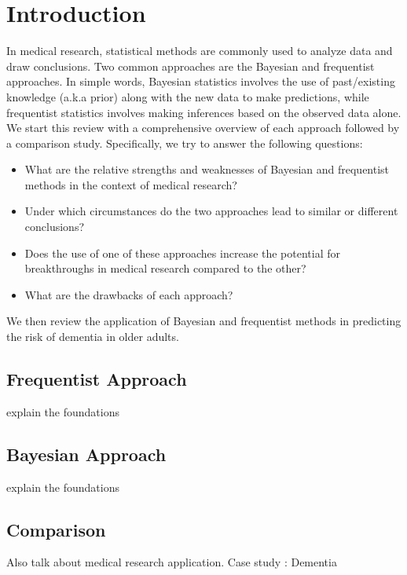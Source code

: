 \documentclass[12pt,letterpaper]{article}
\begin{document}
\par
\thispagestyle{firstpage}
\section{Introduction}
In medical research, statistical methods are commonly used to analyze data and draw conclusions. Two common approaches are the Bayesian and frequentist approaches. In simple words, Bayesian statistics involves the use of past/existing knowledge (a.k.a prior) along with the new data to make predictions, while frequentist statistics involves making inferences based on the observed data alone. We start this review with a comprehensive overview of each approach followed by a comparison study. Specifically, we try to answer the following questions:
\begin{itemize}
    \item What are the relative strengths and weaknesses of Bayesian and frequentist methods in the context of medical research?
    \item  Under which circumstances do the two approaches lead to similar or different conclusions?
    \item Does the use of one of these approaches increase the potential for breakthroughs in medical research compared to the other?
    \item What are the drawbacks of each approach?
\end{itemize}
We then review the application of Bayesian and frequentist methods in predicting the risk of dementia in older adults. 
\subsection{Frequentist Approach}
explain the foundations

\subsection{Bayesian Approach}
explain the foundations
\subsection{Comparison}
Also talk about medical research application. Case study : Dementia
\end{document}
